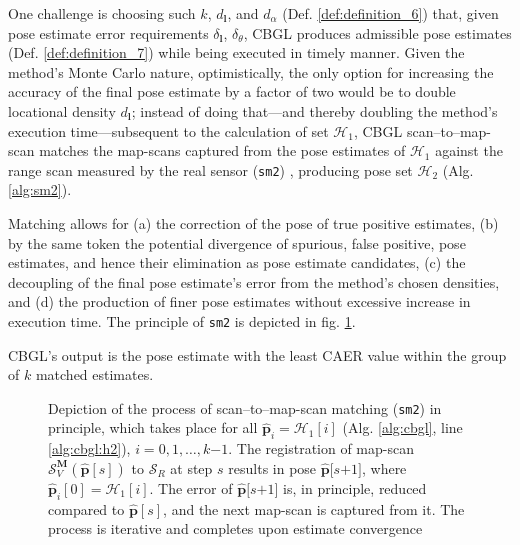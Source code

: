 One challenge is choosing such $k$, $d_{\bm{l}}$, and $d_\alpha$ (Def.
\ref{def:definition_6}) that, given pose estimate error requirements
$\delta_{\bm{l}}$, $\delta_{\theta}$, CBGL produces admissible pose estimates
(Def. \ref{def:definition_7}) while being executed in timely manner.  Given the
method's Monte Carlo nature, optimistically, the only option for increasing the
accuracy of the final pose estimate by a factor of two would be to double
locational density $d_{\bm{l}}$; instead of doing that---and thereby doubling
the method's execution time---subsequent to the calculation of set
$\mathcal{H}_1$, CBGL scan--to--map-scan matches the map-scans captured from
the pose estimates of $\mathcal{H}_1$ against the range scan measured by the
real sensor (\texttt{sm2}) \cite{Vasiljevic2016c,Filotheou2023a}, producing
pose set $\mathcal{H}_2$ (Alg. \ref{alg:sm2}).

Matching allows for (a) the correction of the pose of true positive estimates,
(b) by the same token the potential divergence of spurious, false positive,
pose estimates, and hence their elimination as pose estimate candidates, (c)
the decoupling of the final pose estimate's error from the method's chosen
densities, and (d) the production of finer pose estimates without excessive
increase in execution time. The principle of \texttt{sm2} is depicted in fig.
\ref{fig:sm2_evolution}.

CBGL's output is the pose estimate with the least CAER value within the
group of $k$ matched estimates.


\begin{figure}[H]\vspace{1.3cm}
  
  \caption{\small Depiction of the process of scan--to--map-scan matching
           (\texttt{sm2}) in principle, which takes place for all
           $\hat{\bm{p}}_i = \mathcal{H}_1[i]$ (Alg.
           \ref{alg:cbgl}, line \ref{alg:cbgl:h2}), $i=0,1,\dots,k$$-$$1$. The registration of map-scan
           $\mathcal{S}_V^{\bm{M}}(\hat{\bm{p}}[s])$ to $\mathcal{S}_R$ at step
           $s$ results in pose $\hat{\bm{p}}[s$$+$$1]$, where
           $\hat{\bm{p}}_i[0] = \mathcal{H}_1[i]$. The error of
           $\hat{\bm{p}}[s$$+$$1]$ is, in principle, reduced compared to
           $\hat{\bm{p}}[s]$, and the next map-scan is captured from it. The
           process is iterative and completes upon estimate convergence}
  \label{fig:sm2_evolution}
\end{figure}




